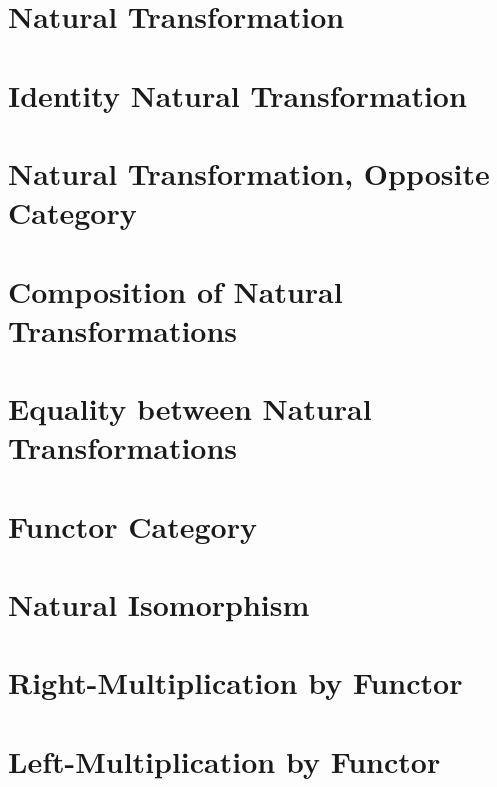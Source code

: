 \section{Natural Transformation}
    
\section{Identity Natural Transformation}
    
\section{Natural Transformation, Opposite Category}
    
\section{Composition of Natural Transformations}
    
\section{Equality between Natural Transformations}
    
\section{Functor Category}
    
\section{Natural Isomorphism}
    
\section{Right-Multiplication by Functor}
    
\section{Left-Multiplication by Functor}
    
